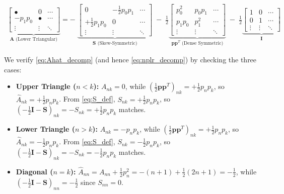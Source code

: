 \documentclass[a4paper,11pt]{article}
\begin{document}
\begin{align}\label{eq:matrix_expansion_A}
\underbrace{
\begin{bmatrix}
\bullet & 0 & \cdots \\
-p_1p_0 & \bullet & \cdots \\
\vdots & \vdots & \ddots
\end{bmatrix}
}_{\mathbf{A}\text{ (Lower Triangular)}}
=
-\;
\underbrace{
\begin{bmatrix}
0 & -\frac12 p_0p_1 & \cdots \\
+\frac12 p_1p_0 & 0 & \cdots \\
\vdots & \vdots & \ddots
\end{bmatrix}
}_{\mathbf{S} \text{ (Skew-Symmetric)}}
\;-\;
\frac12\underbrace{
\begin{bmatrix}
p_0^2 & p_0p_1 & \cdots \\
p_1p_0 & p_1^2 & \cdots \\
\vdots & \vdots & \ddots
\end{bmatrix}
}_{\mathbf{p}\mathbf{p}^T \text{ (Dense Symmetric)}}
\;-\;
\frac12\underbrace{
\begin{bmatrix}
1 & 0 & \cdots \\
0 & 1 & \cdots \\
\vdots & \vdots & \ddots
\end{bmatrix}
}_{\mathbf{I}}
\end{align}

We verify \eqref{eq:Ahat_decomp} (and hence \eqref{eq:nplr_decomp}) by checking the three cases:
\begin{itemize}
    \item \textbf{Upper Triangle ($n<k$):} $A_{nk}=0$, while $\left(\frac{1}{2}\mathbf{p}\mathbf{p}^T\right)_{nk}=+\frac{1}{2}p_np_k$, so $\widehat{A}_{nk}=+\frac{1}{2}p_np_k$. From \eqref{eq:S_def}, $S_{nk}=+\frac{1}{2}p_np_k$, so $(-\frac{1}{2}\mathbf{I}-\mathbf{S})_{nk}=-S_{nk}=+\frac{1}{2}p_np_k$ matches.
    \item \textbf{Lower Triangle ($n>k$):} $A_{nk}=-p_np_k$, while $\left(\frac{1}{2}\mathbf{p}\mathbf{p}^T\right)_{nk}=+\frac{1}{2}p_np_k$, so $\widehat{A}_{nk}=-\frac{1}{2}p_np_k$. From \eqref{eq:S_def}, $S_{nk}=-\frac{1}{2}p_np_k$, so $(-\frac{1}{2}\mathbf{I}-\mathbf{S})_{nk}=-S_{nk}=-\frac{1}{2}p_np_k$ matches.
    \item \textbf{Diagonal ($n=k$):} $\widehat{A}_{nn}=A_{nn}+\frac{1}{2}p_n^2=-(n+1)+\frac{1}{2}(2n+1)=-\frac{1}{2}$, while $(-\frac{1}{2}\mathbf{I}-\mathbf{S})_{nn}=-\frac{1}{2}$ since $S_{nn}=0$.
\end{itemize}
\end{document}
